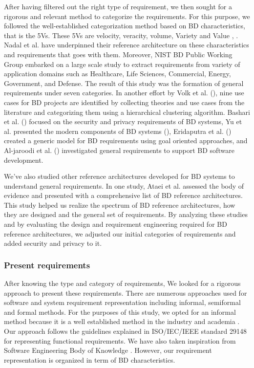 \documentclass[review]{elsarticle}
\begin{document}
After having filtered out the right type of requirement, we then sought for a rigorous and relevant method to categorize the requirements. For this purpose, we followed the well-established categorization method based on BD characteristics, that is the 5Vs. These 5Vs are velocity, veracity, volume, Variety and Value \cite{Bughin2016}, \cite{rad2017big}. Nadal et al. \cite{nadal2017software} have underpinned their reference architecture on these characteristics and requirements that goes with them. Moreover, NIST BD Public Working Group embarked on a large scale study to extract requirements from variety of application domains such as Healthcare, Life Sciences, Commercial, Energy, Government, and Defense. The result of this study was the formation of general requirements under seven categories. In another effort by Volk et al. (\cite{volk2020identifying}), nine use cases for BD projects are identified by collecting theories and use cases from the literature and categorizing them using a hierarchical clustering algorithm. Bashari et al. (\cite{bashari2016security}) focused on the security and privacy requirements of BD systems, Yu et al. presented the modern components of BD systems (\cite{yu2019components}), Eridaputra et al. (\cite{eridaputra2014modeling}) created a generic model for BD requirements using goal oriented approaches, and Al-jaroodi et al. (\cite{al2016characteristics}) investigated general requirements to support BD software development. 

We've also studied other reference architectures developed for BD systems to understand general requirements. In one study, Ataei et al. \cite{ataei2020big} assessed the body of evidence and presented with a comprehensive list of BD reference architectures. This study helped us realize the spectrum of BD reference architectures, how they are designed and the general set of requirements. By analyzing these studies and by evaluating the design and requirement engineering required for BD reference architectures, we adjusted our initial categories of requirements and added security and privacy to it.

\subsubsection{Present requirements}
After knowing the type and category of requirements, We looked for a rigorous approach to present these requirements. There are numerous approaches used for software and system requirement representation including informal, semiformal and formal methods. For the purposes of this study, we opted for an informal method because it is a well established method in the industry and academia \cite{kassab2014state}. Our approach follows the guidelines explained in ISO/IEC/IEEE standard 29148 \cite{ISO29148} for representing functional requirements. We have also taken inspiration from Software Engineering Body of Knowledge \cite{abran2004software}. However, our requirement representation is organized in term of BD characteristics. 
\end{document}
